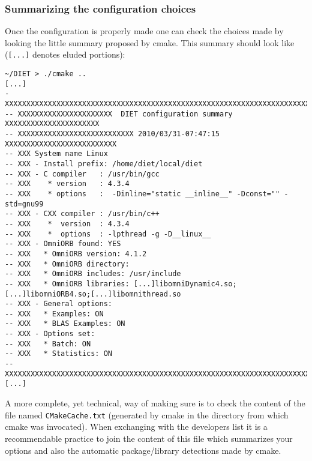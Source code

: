 \subsubsection{Summarizing the configuration choices}
Once the configuration is properly made one can check the choices made by
looking the little summary proposed by cmake.  This summary should look like
(\verb+[...]+ denotes eluded portions): {\footnotesize


\begin{verbatim}
~/DIET > ./cmake ..
[...]
- XXXXXXXXXXXXXXXXXXXXXXXXXXXXXXXXXXXXXXXXXXXXXXXXXXXXXXXXXXXXXXXXXXXXXXXXXX
-- XXXXXXXXXXXXXXXXXXXXXX  DIET configuration summary  XXXXXXXXXXXXXXXXXXXXXX
-- XXXXXXXXXXXXXXXXXXXXXXXXXXX 2010/03/31-07:47:15 XXXXXXXXXXXXXXXXXXXXXXXXXX
-- XXX System name Linux
-- XXX - Install prefix: /home/diet/local/diet
-- XXX - C compiler   : /usr/bin/gcc
-- XXX    * version   : 4.3.4
-- XXX    * options   :  -Dinline="static __inline__" -Dconst="" -std=gnu99
-- XXX - CXX compiler : /usr/bin/c++
-- XXX    *  version  : 4.3.4
-- XXX    *  options  : -lpthread -g -D__linux__
-- XXX - OmniORB found: YES
-- XXX   * OmniORB version: 4.1.2
-- XXX   * OmniORB directory:
-- XXX   * OmniORB includes: /usr/include
-- XXX   * OmniORB libraries: [...]libomniDynamic4.so;[...]libomniORB4.so;[...]libomnithread.so
-- XXX - General options:
-- XXX   * Examples: ON
-- XXX   * BLAS Examples: ON
-- XXX - Options set:
-- XXX   * Batch: ON
-- XXX   * Statistics: ON
-- XXXXXXXXXXXXXXXXXXXXXXXXXXXXXXXXXXXXXXXXXXXXXXXXXXXXXXXXXXXXXXXXXXXXXXXXXX
[...]
\end{verbatim}
} A more complete, yet technical, way of making sure is to check the
content of the file named \verb+CMakeCache.txt+ (generated by cmake in
the directory from which cmake was invocated). When exchanging with
the developers list it is a recommendable practice to join the content
of this file which summarizes your options and also the automatic
package/library detections made by cmake.

